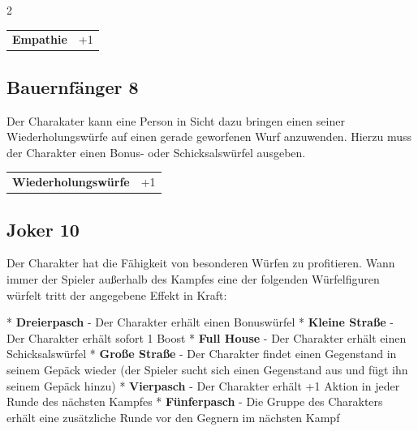 \begin{multicols}{2}
\begin{tcolorbox}
\vspace{3mm}

\begin{tabular}{@{}ll@{}}
    \textbf{Empathie} & +1\\
\end{tabular}


\end{tcolorbox}

\begin{tcolorbox}
    \subsection*{Bauernfänger \hfill \small{8 }}
    \tcblower
Der Charakater kann eine Person in Sicht dazu bringen einen seiner Wiederholungswürfe auf einen gerade geworfenen Wurf anzuwenden. Hierzu muss der Charakter einen Bonus- oder Schicksalswürfel ausgeben.


\vspace{3mm}

\begin{tabular}{@{}ll@{}}
    \textbf{Wiederholungswürfe} & +1\\
\end{tabular}


\end{tcolorbox}

\begin{tcolorbox}
    \subsection*{Joker \hfill \small{10 }}
    \tcblower
Der Charakter hat die Fähigkeit von besonderen Würfen zu profitieren. Wann immer der Spieler außerhalb des Kampfes eine der folgenden Würfelfiguren würfelt tritt der angegebene Effekt in Kraft:

* \textbf{Dreierpasch} - Der Charakter erhält einen Bonuswürfel
* \textbf{Kleine Straße} - Der Charakter erhält sofort 1 Boost
* \textbf{Full House} - Der Charakter erhält einen Schicksalswürfel
* \textbf{Große Straße} - Der Charakter findet einen Gegenstand in seinem Gepäck wieder (der Spieler sucht sich einen Gegenstand aus und fügt ihn seinem Gepäck hinzu)
* \textbf{Vierpasch} - Der Charakter erhält +1 Aktion in jeder Runde des nächsten Kampfes
* \textbf{Fünferpasch} - Die Gruppe des Charakters erhält eine zusätzliche Runde vor den Gegnern im nächsten Kampf


\end{tcolorbox}
\end{multicols}

